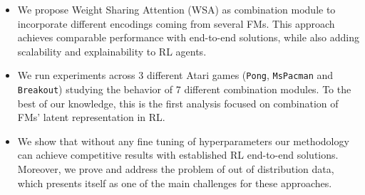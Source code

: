 \begin{itemize}
    \item We propose Weight Sharing Attention (WSA) as combination module to incorporate different encodings coming from several FMs. This approach achieves comparable performance with end-to-end solutions, while also adding scalability and explainability to RL agents.
    \item We run experiments across 3 different Atari games (\texttt{Pong}, \texttt{MsPacman} and \texttt{Breakout}) studying the behavior of 7 different combination modules. To the best of our knowledge, this is the first analysis focused on combination of FMs' latent representation in RL.
    \item We show that without any fine tuning of hyperparameters our methodology can achieve competitive results with established RL end-to-end solutions. Moreover, we prove and address the problem of out of distribution data, which presents itself as one of the main challenges for these approaches. 
\end{itemize}




